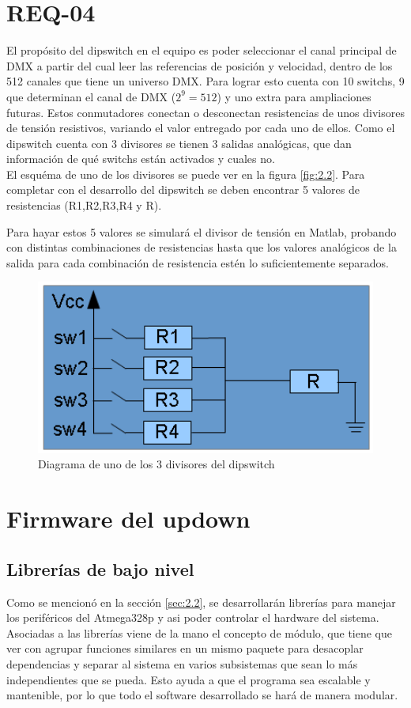 \section{REQ-04} \label{sec:\thesection}
El propósito del dipswitch en el equipo es poder seleccionar el canal principal de DMX a partir del cual leer las referencias de posición y velocidad, dentro de los 512 canales que tiene un universo DMX. Para lograr esto cuenta con 10 switchs, 9 que determinan el canal de DMX (\( 2^9 = 512 \)) y uno extra para ampliaciones futuras. Estos conmutadores conectan o desconectan resistencias de unos divisores de tensión resistivos, variando el valor entregado por cada uno de ellos. Como el dipswitch cuenta con 3 divisores se tienen 3 salidas analógicas, que dan información de qué switchs están activados y cuales no. \\
El esquéma de uno de los divisores se puede ver en la figura \ref{fig:2.2}. Para completar con el desarrollo del dipswitch se deben encontrar 5 valores de resistencias (R1,R2,R3,R4 y R).

Para hayar estos 5 valores se simulará el divisor de tensión en Matlab, probando con distintas combinaciones de resistencias hasta que los valores analógicos de la salida para cada combinación de resistencia estén lo suficientemente separados.

\begin{figure}[!ht]
	\centering
	\includegraphics[width=12cm,scale=1]{resources/2_2-dipswitch.png}
	\caption{Diagrama de uno de los 3 divisores del dipswitch}
	\label{fig:\thefigure}
\end{figure}


\section{Firmware del updown} \label{sec:\thesection}
\subsection{Librerías de bajo nivel}
Como se mencionó en la sección \ref{sec:2.2}, se desarrollarán librerías para manejar los periféricos del Atmega328p y asi poder controlar el hardware del sistema.\\
Asociadas a las librerías viene de la mano el concepto de módulo, que tiene que ver con agrupar funciones similares en un mismo paquete para desacoplar dependencias y separar al sistema en varios subsistemas que sean lo más independientes que se pueda. Esto ayuda a que el programa sea escalable y mantenible, por lo que todo el software desarrollado se hará de manera modular.

